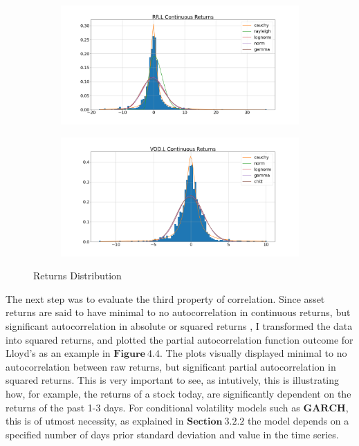 \begin{figure}[hbt!]
\medskip %
\begin{subfigure}{.49\linewidth}
  \includegraphics[width=\linewidth]{images/returnDist/plot 3.png}
  \caption{}
  \label{velcomp}
\end{subfigure} %
\begin{subfigure}{.49\linewidth}
  \includegraphics[width=\linewidth]{images/returnDist/plot 4.png}
  \caption{}
  \label{estcomp}
\end{subfigure}
\caption{Returns Distribution}
\end{figure}

The next step was to evaluate the third property of correlation. Since asset returns are said to have minimal to no autocorrelation in continuous returns, but significant autocorrelation in absolute or squared returns \cite{Popov2022}, I transformed the data into squared returns, and plotted the partial autocorrelation function outcome for Lloyd's as an example in $\mathbf{Figure~4.4}$. The plots visually displayed minimal to no autocorrelation between raw returns, but significant partial autocorrelation in squared returns. This is very important to see, as intutively, this is illustrating how, for example, the returns of a stock today, are significantly dependent on the returns of the past 1-3 days. For conditional volatility models such as $\mathbf{GARCH}$, this is of utmost necessity, as explained in $\mathbf{Section~3.2.2}$ the model depends on a specified number of days prior standard deviation and value in the time series. 
  

